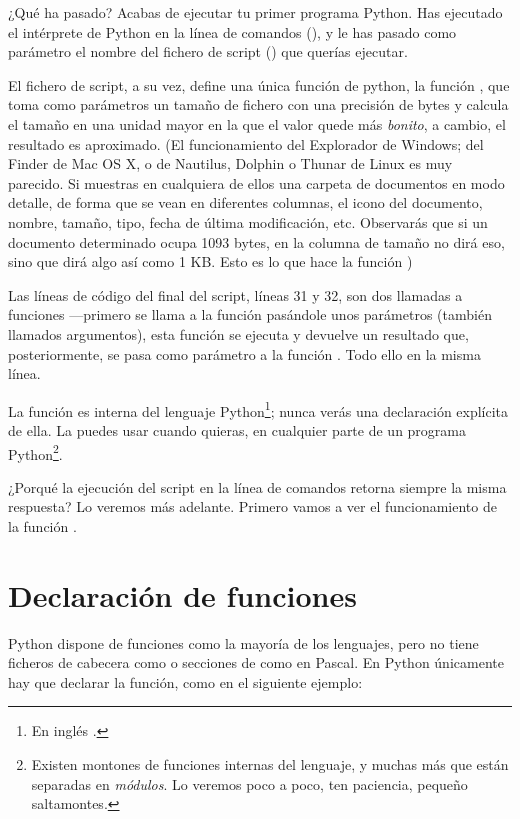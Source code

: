 ¿Qué ha pasado? Acabas de ejecutar tu primer programa Python. Has ejecutado el intérprete de Python en la línea de comandos (), y le has pasado como parámetro el nombre del fichero de script () que querías ejecutar. 

El fichero de script, a su vez, define una única función de python, la función , que toma como parámetros un tamaño de fichero con una precisión de bytes y calcula el tamaño en una unidad mayor en la que el valor quede más \emph{bonito}, a cambio, el resultado es aproximado. (El funcionamiento del Explorador de Windows; del Finder de Mac OS X, o de Nautilus, Dolphin o Thunar de Linux es muy parecido. Si muestras en cualquiera de ellos una carpeta de documentos en modo detalle, de forma que se vean en diferentes columnas, el icono del documento, nombre, tamaño, tipo, fecha de última modificación, etc. Observarás que si un documento determinado ocupa 1093 bytes, en la columna de tamaño no dirá eso, sino que dirá algo así como 1 KB. Esto es lo que hace la función )

Las líneas de código  del final del script, líneas 31 y 32, son dos llamadas a funciones ---primero se llama a la función  pasándole unos parámetros (también llamados argumentos), esta función se ejecuta y devuelve un resultado que, posteriormente, se pasa como parámetro a la función . Todo ello en la misma línea.

La función  es interna del lenguaje Python\footnote{En inglés .}; nunca verás una declaración explícita de ella. La puedes usar cuando quieras, en cualquier parte de un programa Python\footnote{Existen montones de funciones internas del lenguaje, y muchas más que están separadas en \emph{módulos}. Lo veremos poco a poco, ten paciencia, pequeño saltamontes.}.

¿Porqué la ejecución del script en la línea de comandos retorna siempre la misma respuesta? Lo veremos más adelante. Primero vamos a ver el funcionamiento de la función .

\section{Declaración de funciones}

Python dispone de funciones como la mayoría de los lenguajes, pero no tiene ficheros de cabecera como  o secciones de  como en Pascal. En Python únicamente hay que declarar la función, como en el siguiente ejemplo:

